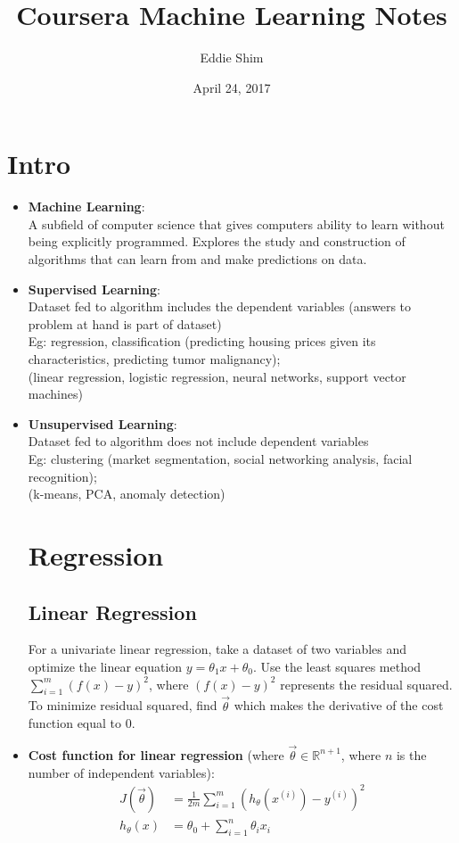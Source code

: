 \documentclass[titlepage]{article}
\author{Eddie Shim}
\title{Coursera Machine Learning Notes}
\date{April 24, 2017}
\begin{document}
	\maketitle
\section{Intro}
\begin{itemize}
	
	\item \textbf{Machine Learning}:
	\\ A subfield of computer science that gives computers ability to learn without being explicitly programmed. Explores the study and construction of algorithms that can learn from and make predictions on data.
	\\
	\item \textbf{Supervised Learning}:
	\\Dataset fed to algorithm includes the dependent variables (answers to problem at hand is part of dataset) \\Eg: regression, classification (predicting housing prices given its characteristics, predicting tumor malignancy); \\(linear regression, logistic regression, neural networks, support vector machines)
	\\
	\item \textbf{Unsupervised Learning}:
	\\Dataset fed to algorithm does not include dependent variables \\Eg: clustering (market segmentation, social networking analysis, facial recognition); \\(k-means, PCA, anomaly detection)
	
	\section{Regression}
	\subsection{Linear Regression}
	For a univariate linear regression, take a dataset of two variables and optimize the linear equation $y= \theta_1 x + \theta_0$. Use the least squares method $\sum_{i=1}^{m} (f(x)-y)^2$, where $(f(x)-y)^2$ represents the residual squared. To minimize residual squared, find $\vec\theta$ which makes the derivative of the cost function equal to 0.
	
	\item \textbf{Cost function for linear regression} (where $\vec{\theta} \in \mathbb{R}^{n+1}$, where $n$ is the number of independent variables):
	\begin{align*}
		J(\vec\theta) &= \frac{1}{2m} \sum_{i=1}^{m}(h_{\theta}(x^{(i)}) - y^{(i)})^2\\
		h_\theta(x) &= \theta_0 + \sum_{i=1}^{n} \theta_i x_i
	\end{align*}
	

\end{itemize}
\end{document}
